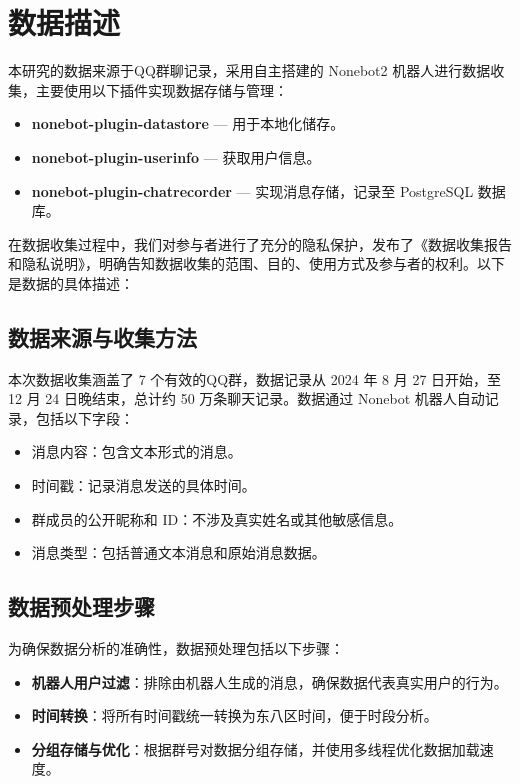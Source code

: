 \documentclass{paper}
\begin{document}
\section{数据描述}

本研究的数据来源于QQ群聊记录，采用自主搭建的 Nonebot2 机器人进行数据收集，主要使用以下插件实现数据存储与管理：

\begin{itemize}
    \item \textbf{nonebot-plugin-datastore} — 用于本地化储存。
    \item \textbf{nonebot-plugin-userinfo} — 获取用户信息。
    \item \textbf{nonebot-plugin-chatrecorder} — 实现消息存储，记录至 PostgreSQL 数据库。
\end{itemize}

在数据收集过程中，我们对参与者进行了充分的隐私保护，发布了《数据收集报告和隐私说明》，明确告知数据收集的范围、目的、使用方式及参与者的权利。以下是数据的具体描述：

\subsection{数据来源与收集方法}
本次数据收集涵盖了 7 个有效的QQ群，数据记录从 2024 年 8 月 27 日开始，至 12 月 24 日晚结束，总计约 50 万条聊天记录。数据通过 Nonebot 机器人自动记录，包括以下字段：
\begin{itemize}
    \item 消息内容：包含文本形式的消息。
    \item 时间戳：记录消息发送的具体时间。
    \item 群成员的公开昵称和 ID：不涉及真实姓名或其他敏感信息。
    \item 消息类型：包括普通文本消息和原始消息数据。
\end{itemize}

\subsection{数据预处理步骤}
为确保数据分析的准确性，数据预处理包括以下步骤：
\begin{itemize}
    \item \textbf{机器人用户过滤}：排除由机器人生成的消息，确保数据代表真实用户的行为。
    \item \textbf{时间转换}：将所有时间戳统一转换为东八区时间，便于时段分析。
    \item \textbf{分组存储与优化}：根据群号对数据分组存储，并使用多线程优化数据加载速度。
\end{itemize}
\end{document}
